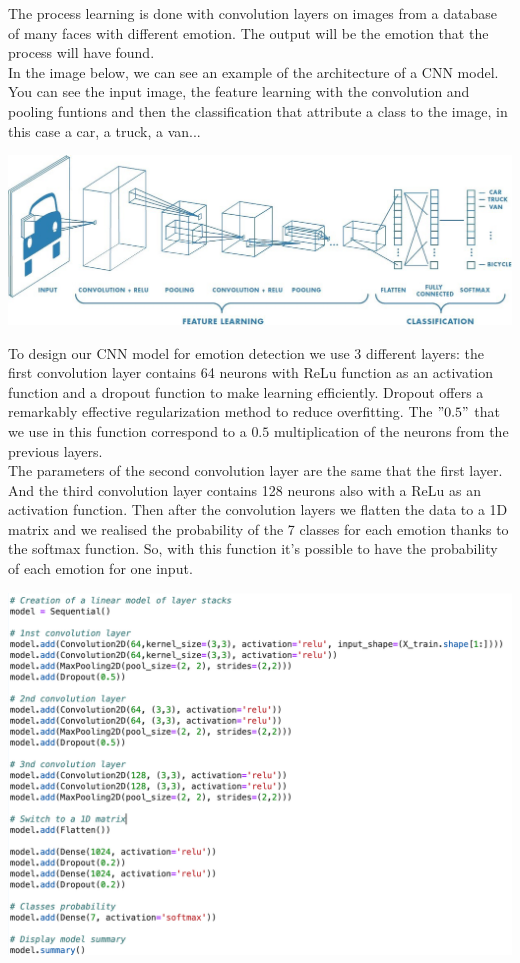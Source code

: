 \documentclass[a4paper, 10pt, conference]{ieeeconf}      %
\begin{document}
The process learning is done with convolution layers on images from a database of many faces with different emotion. The output will be the emotion that the process will have found.\\
In the image below, we can see an example of the architecture of a CNN model.
You can see the input image, the feature learning with the convolution and pooling funtions and then the classification that attribute a class to the image, in this case a car, a truck, a van...

\begin{center}
\includegraphics[scale=0.17]{Exemple_CNN.jpeg}
\label{fig1}
\end{center}

To design our CNN model for emotion detection we use 3 different layers:
the first convolution layer contains 64 neurons with ReLu function as an activation function and a dropout function to make learning efficiently.
Dropout offers a remarkably effective regularization method to reduce overfitting.
The $"0.5"$ that we use in this function correspond to a $0.5$ multiplication of the neurons from the previous layers.\\
The parameters of the second convolution layer are the same that the first layer.
And the third convolution layer contains 128 neurons also with a ReLu as an activation function.
Then after the convolution layers we flatten the data to a 1D matrix and we realised the probability of the 7 classes for each emotion thanks to the softmax function.
So, with this function it's possible to have the probability of each emotion for one input.

\begin{center}
\includegraphics[scale=0.3]{Model}
\label{fig2}
\end{center}
\end{document}
